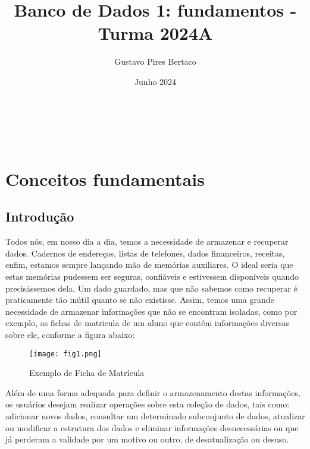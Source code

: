 \documentclass{article}
\title{Banco de Dados 1: fundamentos - Turma 2024A}
\author{Gustavo Pires Bertaco}
\date{Junho 2024}
\begin{document}
\maketitle

\AtBeginShipoutNext{\tableofcontents}

\newpage
\\ 
\\ 
\newpage

\section{Conceitos fundamentais}
\subsection{Introdução}
Todos nós, em nosso dia a dia, temos a necessidade de armazenar e recuperar dados. Cadernos de endereços, listas de telefones, dados financeiros, receitas, enfim, estamos sempre lançando mão de memórias auxiliares. O ideal seria que estas memórias pudessem ser seguras, confiáveis e estivessem disponíveis quando precisássemos dela. Um dado guardado, mas que não sabemos como recuperar é praticamente tão inútil quanto se não existisse. Assim, temos uma grande necessidade de armazenar informações que não se encontram isoladas, como por exemplo, as fichas de matricula de um aluno que contém informações diversas sobre ele, conforme a figura abaixo:

\begin{figure}[h]
    \centering
    \texttt{[image: fig1.png]}
    \caption{Exemplo de Ficha de Matrícula}
    \label{fig:fig1}
\end{figure}

Além de uma forma adequada para definir o armazenamento destas informações, os usuários desejam realizar operações sobre esta coleção de dados, tais como: adicionar novos dados, consultar um determinado subconjunto de dados, atualizar ou modificar a estrutura dos dados e eliminar informações desnecessárias ou que já perderam a validade por um motivo ou outro, de desatualização ou desuso.
\end{document}
